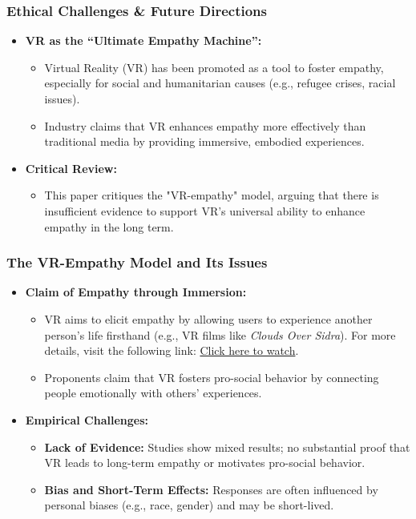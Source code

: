 \documentclass[aspectratio=169,xcolor=dvipsnames]{beamer}
\begin{document}
\begin{frame}
\frametitle{Ethical Challenges \& Future Directions}
\begin{itemize}
    \item \textbf{VR as the “Ultimate Empathy Machine”:}
    \begin{itemize}
        \item Virtual Reality (VR) has been promoted as a tool to foster empathy, especially for social and humanitarian causes (e.g., refugee crises, racial issues).
        \item Industry claims that VR enhances empathy more effectively than traditional media by providing immersive, embodied experiences.
    \end{itemize}
    \item \textbf{Critical Review:}
    \begin{itemize}
        \item This paper critiques the "VR-empathy" model, arguing that there is insufficient evidence to support VR's universal ability to enhance empathy in the long term.
    \end{itemize}
\end{itemize}
\end{frame}

\begin{frame}
\frametitle{The VR-Empathy Model and Its Issues}
\begin{itemize}
    \item \textbf{Claim of Empathy through Immersion:}
    \begin{itemize}
          \item VR aims to elicit empathy by allowing users to experience another person’s life firsthand (e.g., VR films like \textit{Clouds Over Sidra}). For more details, visit the following link: \href{https://v.qq.com/x/page/d03194nt7hs.html}{Click here to watch}.

        \item Proponents claim that VR fosters pro-social behavior by connecting people emotionally with others' experiences.
    \end{itemize}
    \item \textbf{Empirical Challenges:}
    \begin{itemize}
        \item \textbf{Lack of Evidence:} Studies show mixed results; no substantial proof that VR leads to long-term empathy or motivates pro-social behavior.
        \item \textbf{Bias and Short-Term Effects:} Responses are often influenced by personal biases (e.g., race, gender) and may be short-lived.
    \end{itemize}
\end{itemize}
\end{frame}
\end{document}
